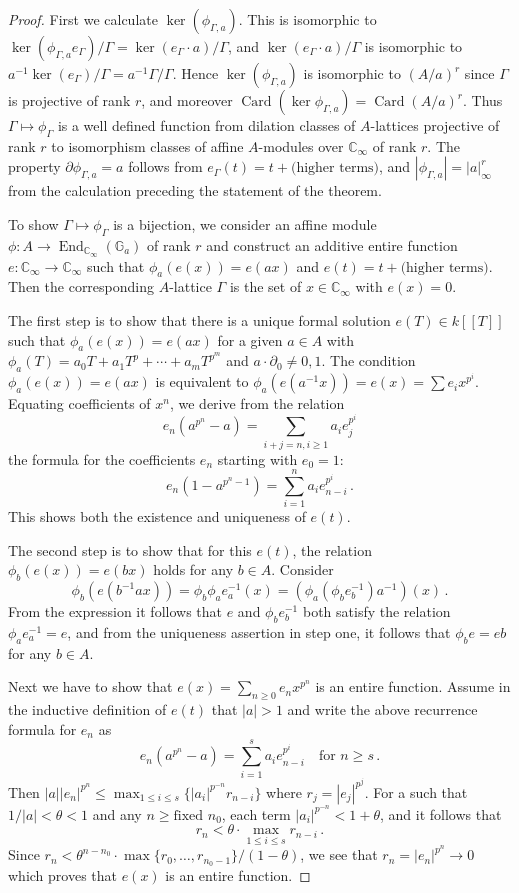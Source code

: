 \documentclass[12pt,a4paper]{article}
\theoremstyle{plain}
\theoremstyle{definition}
\theoremstyle{remark}
\DeclareMathOperator{\End}{End}
\DeclareMathOperator{\Card}{Card}
\begin{document}
\begin{proof}
First we calculate $\ker(\phi_{\Gamma,a})$. This is isomorphic to 
$\ker(\phi_{\Gamma,a} e_\Gamma)/\Gamma = \ker(e_\Gamma \cdot a)/\Gamma$, and 
$\ker(e_\Gamma \cdot a)/\Gamma$ is isomorphic to $a^{-1}\ker(e_\Gamma)/\Gamma 
= a^{-1}\Gamma/\Gamma$. Hence $\ker(\phi_{\Gamma,a})$ is isomorphic to 
$(A/a)^r$ since $\Gamma$ is projective of rank $r$, and moreover 
$\Card(\ker\phi_{\Gamma,a}) = \Card(A/a)^r$. Thus $\Gamma \mapsto \phi_\Gamma$ 
is a well defined function from dilation classes of $A$-lattices projective of 
rank $r$ to isomorphism classes of affine $A$-modules over $\mathbb{C}_\infty$ 
of rank $r$. The property $\partial\phi_{\Gamma,a} = a$ follows from 
$e_\Gamma(t) = t + \text{(higher terms)}$, and $|\phi_{\Gamma,a}| = |a|_\infty^r$ 
from the calculation preceding the statement of the theorem.

To show $\Gamma \mapsto \phi_\Gamma$ is a bijection, we consider an affine module 
$\phi\colon A \to \End_{\mathbb{C}_\infty}(\mathbb{G}_a)$ of rank $r$ and 
construct an additive entire function $e\colon \mathbb{C}_\infty \to \mathbb{C}_\infty$ 
such that $\phi_a(e(x)) = e(ax)$ and $e(t) = t + \text{(higher terms)}$. Then 
the corresponding $A$-lattice $\Gamma$ is the set of $x \in \mathbb{C}_\infty$ 
with $e(x) = 0$.

The first step is to show that there is a unique formal solution 
$e(T) \in k[[T]]$ such that $\phi_a(e(x)) = e(ax)$ for a given $a \in A$ with 
$\phi_a(T) = a_0 T + a_1 T^p + \cdots + a_m T^{p^m}$ and $a \cdot \partial_0 \neq 0, 1$. 
The condition $\phi_a(e(x)) = e(ax)$ is equivalent to 
$\phi_a(e(a^{-1}x)) = e(x) = \sum e_i x^{p^i}$. Equating coefficients of $x^n$, 
we derive from the relation
\[
e_n(a^{p^n} - a) = \sum_{i+j=n, i \geqslant 1} a_i e_j^{p^i}
\]
the formula for the coefficients $e_n$ starting with $e_0 = 1$:
\[
e_n(1 - a^{p^n-1}) = \sum_{i=1}^n a_i e_{n-i}^{p^i} \,.
\]
This shows both the existence and uniqueness of $e(t)$.

The second step is to show that for this $e(t)$, the relation 
$\phi_b(e(x)) = e(bx)$ holds for any $b \in A$. Consider
\[
\phi_b(e(b^{-1}ax)) = \phi_b \phi_a e_a^{-1}(x) = (\phi_a(\phi_b e_b^{-1})a^{-1})(x) \,.
\]
From the expression it follows that $e$ and $\phi_b e_b^{-1}$ both satisfy the 
relation $\phi_a e_a^{-1} = e$, and from the uniqueness assertion in step one, 
it follows that $\phi_b e = eb$ for any $b \in A$.

Next we have to show that $e(x) = \sum_{n \geqslant 0} e_n x^{p^n}$ is an entire 
function. Assume in the inductive definition of $e(t)$ that $|a| > 1$ and write 
the above recurrence formula for $e_n$ as
\[
e_n(a^{p^n} - a) = \sum_{i=1}^s a_i e_{n-i}^{p^i} \quad\text{for } n \geqslant s \,.
\]
Then $|a||e_n|^{p^n} \leqslant \max_{1 \leqslant i \leqslant s}\{|a_i|^{p^{-n}} r_{n-i}\}$ 
where $r_j = |e_j|^{p^j}$. For a such that $1/|a| < \theta < 1$ and any 
$n \geqslant \text{fixed } n_0$, each term $|a_i|^{p^{-n}} < 1 + \theta$, and it 
follows that
\[
r_n < \theta \cdot \max_{1 \leqslant i \leqslant s} r_{n-i} \,.
\]
Since $r_n < \theta^{n-n_0} \cdot \max\{r_0, \ldots, r_{n_0-1}\}/(1-\theta)$, we see 
that $r_n = |e_n|^{p^n} \to 0$ which proves that $e(x)$ is an entire function.


\end{proof}
\end{document}
